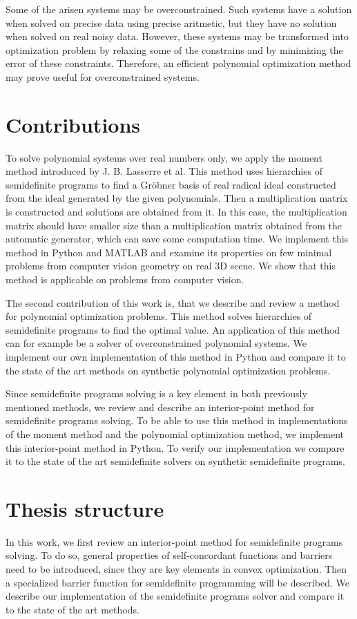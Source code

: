 Some of the arisen systems may be overconstrained.
Such systems have a solution when solved on precise data using precise aritmetic, but they have no solution when solved on real noisy data.
However, these systems may be transformed into optimization problem by relaxing some of the constrains and by minimizing the error of these constraints.
Therefore, an efficient polynomial optimization method may prove useful for overconstrained systems.

\section{Contributions}
To solve polynomial systems over real numbers only, we apply the moment method introduced by J. B. Lasserre et al.
This method uses hierarchies of semidefinite programs to find a Gr\"obner basis of real radical ideal constructed from the ideal generated by the given polynomials.
Then a multiplication matrix is constructed and solutions are obtained from it.
In this case, the multiplication matrix should have smaller size than a multiplication matrix obtained from the automatic generator, which can save some computation time.
We implement this method in Python and MATLAB and examine its properties on few minimal problems from computer vision geometry on real 3D scene.
We show that this method is applicable on problems from computer vision.

The second contribution of this work is, that we describe and review a method for polynomial optimization problems.
This method solves hierarchies of semidefinite programs to find the optimal value.
An application of this method can for example be a solver of overconstrained polynomial systems.
We implement our own implementation of this method in Python and compare it to the state of the art methods on synthetic polynomial optimization problems.

Since semidefinite programs solving is a key element in both previously mentioned methods, we review and describe an interior-point method for semidefinite programs solving.
To be able to use this method in implementations of the moment method and the polynomial optimization method, we implement this interior-point method in Python.
To verify our implementation we compare it to the state of the art semidefinite solvers on synthetic semidefinite programs.

\section{Thesis structure}
In this work, we first review an interior-point method for semidefinite programs solving.
To do so, general properties of self-concordant functions and barriers need to be introduced, since they are key elements in convex optimization.
Then a specialized barrier function for semidefinite programming will be described.
We describe our implementation of the semidefinite programs solver and compare it to the state of the art methods.

